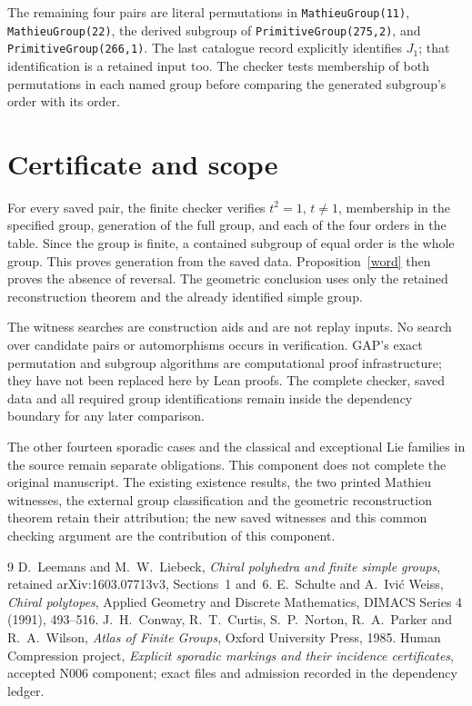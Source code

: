 \documentclass[11pt,a4paper]{article}
\begin{document}
The remaining four pairs are literal permutations in
\texttt{MathieuGroup(11)}, \texttt{MathieuGroup(22)},
the derived subgroup of \texttt{PrimitiveGroup(275,2)}, and
\texttt{PrimitiveGroup(266,1)}. The last catalogue record explicitly
identifies $J_1$; that identification is a retained input too.
The checker tests membership of both permutations in each named
group before comparing the generated subgroup's order with its order.

\section{Certificate and scope}
For every saved pair, the finite checker verifies $t^2=1$, $t\ne1$,
membership in the specified group, generation of the full group,
and each of the four orders in the table. Since the group is finite,
a contained subgroup of equal order is the whole group. This proves
generation from the saved data. Proposition~\ref{word} then proves
the absence of reversal. The geometric conclusion uses only the
retained reconstruction theorem and the already identified simple
group.

The witness searches are construction aids and are not replay inputs.
No search over candidate pairs or automorphisms occurs in verification.
GAP's exact permutation and subgroup algorithms are computational proof
infrastructure; they have not been replaced here by Lean proofs.
The complete checker, saved data and all required group identifications
remain inside the dependency boundary for any later comparison.

The other fourteen sporadic cases and the classical and exceptional
Lie families in the source remain separate obligations. This component
does not complete the original manuscript. The existing existence
results, the two printed Mathieu witnesses, the external group
classification and the geometric reconstruction theorem retain their
attribution; the new saved witnesses and this common checking argument
are the contribution of this component.

\begin{thebibliography}{9}
 D.~Leemans and M.~W.~Liebeck, \emph{Chiral polyhedra and
finite simple groups}, retained arXiv:1603.07713v3, Sections~1 and~6.
 E.~Schulte and A.~Ivi\'c Weiss, \emph{Chiral polytopes},
Applied Geometry and Discrete Mathematics, DIMACS Series 4 (1991), 493--516.
 J.~H.~Conway, R.~T.~Curtis, S.~P.~Norton, R.~A.~Parker
and R.~A.~Wilson, \emph{Atlas of Finite Groups}, Oxford University Press, 1985.
 Human Compression project, \emph{Explicit sporadic
markings and their incidence certificates}, accepted N006 component;
exact files and admission recorded in the dependency ledger.
\end{thebibliography}
\end{document}
